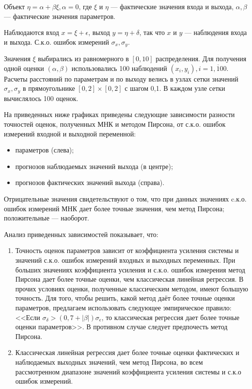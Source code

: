 \documentclass[a4paper,landscape,hidelinks,14pt]{extarticle}
\begin{document}

Объект \( \eta = \alpha + \beta \xi, \alpha = 0 \),
где \( \xi \) и \( \eta \) --- фактические значения входа и выхода,
\( \alpha, \beta \) --- фактические значения параметров.

Наблюдаются вход \( x = \xi + \epsilon \), выход \( y = \eta + \delta \),
так что \( x \) и \( y \) --- наблюдения входа и выхода.
С.к.о. ошибок измерений \( \sigma_x, \sigma_y \).

Значения \( \xi \) выбирались из равномерного в \( [0, 10] \) распределения.
Для получения одной оценки \( ( \alpha, \beta ) \) использовались 100 наблюдений
\( ( x_i, y_i ), i = \overline{1, 100} \). Расчеты расстояний по параметрам и по выходу
велись в узлах сетки значений \( \sigma_x, \sigma_y \) в прямоугольнике
\( [0, 2] \times [0, 2] \) с шагом 0{,}1. В каждом узле сетки вычислялось 100 оценок.

На приведенных ниже графиках приведены следующие зависимости
разности точностей оценок, полученных МНК и методом Пирсона, от
с.к.о. ошибок измерений входной и выходной переменной:
\begin{itemize}
\item параметров (слева);
\item прогнозов наблюдаемых значений выхода (в центре);
\item прогнозов фактических значений выхода (справа).
\end{itemize}

Отрицательные значения свидетельствуют о том, что при данных значениях
c.к.о. ошибок измерений МНК дает более точные значения, чем метод Пирсона;
положительные --- наоборот.

Анализ приведенных зависимостей показывает, что:
\begin{enumerate}
\item Точность оценок параметров зависит от коэффициента усиления системы и
  значений с.к.о. ошибок измерений входных и выходных переменных.
  При больших значениях коэффициента усиления и с.к.о. ошибок измерения
  метод Пирсона дает более точные оценки, чем классическая линейная регрессия.
  В прочих условиях оценки, полученные классическим методом, имеют большую точность.
  Для того, чтобы решить, какой метод даёт более точные оценки параметров,
  предлагаем использовать следующее эмпирическое правило:
  <<Если \( \sigma_{\delta} > (0{,}7 + |\beta|) \sigma_{\epsilon} \),
  то классическая регрессия дает более точные оценки параметров>>.
  В противном случае следует предпочесть метод Пирсона.
\item Классическая линейная регрессия дает более точные оценки
  фактических и наблюдаемых выходных значений, чем метод Пирсона,
  во всем рассмотренном диапазоне значений коэффициента усиления системы и
  с.к.о ошибок измерений.
\end{enumerate}
\end{document}
